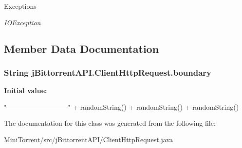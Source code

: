 \begin{DoxyExceptions}{Exceptions}
\item[{\em IOException}]\end{DoxyExceptions}


\subsection{Member Data Documentation}
\hypertarget{classj_bittorrent_a_p_i_1_1_client_http_request_a7c8da81b3c13290de8ec6f286fae990c}{
\subsubsection[{boundary}]{\setlength{\rightskip}{0pt plus 5cm}String jBittorrentAPI.ClientHttpRequest.boundary}}
\label{classj_bittorrent_a_p_i_1_1_client_http_request_a7c8da81b3c13290de8ec6f286fae990c}
{\bfseries Initial value:}
\begin{DoxyCode}
 "---------------------------" + randomString() +
                      randomString() + randomString()
\end{DoxyCode}


The documentation for this class was generated from the following file:\begin{DoxyCompactItemize}
\item 
MiniTorrent/src/jBittorrentAPI/ClientHttpRequest.java\end{DoxyCompactItemize}
